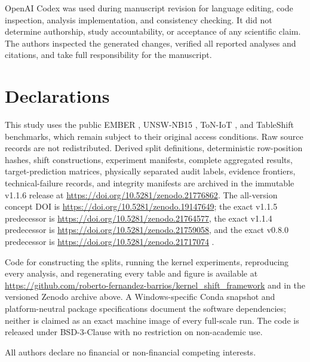 \documentclass[referee,lineno,pdflatex,sn-nature]{sn-jnl}
\theoremstyle{thmstyleone}%
\theoremstyle{thmstyletwo}%
\theoremstyle{thmstylethree}%
\begin{document}
OpenAI Codex was used during manuscript revision for language editing, code inspection, analysis implementation, and consistency checking. It did not determine authorship, study accountability, or acceptance of any scientific claim. The authors inspected the generated changes, verified all reported analyses and citations, and take full responsibility for the manuscript.

\backmatter

\section*{Declarations}

This study uses the public EMBER \cite{anderson2018ember}, UNSW-NB15 \cite{moustafa2015unsw}, ToN-IoT \cite{alsaedi2020toniot}, and TableShift \cite{gardner2023tableshift} benchmarks, which remain subject to their original access conditions. Raw source records are not redistributed. Derived split definitions, deterministic row-position hashes, shift constructions, experiment manifests, complete aggregated results, target-prediction matrices, physically separated audit labels, evidence frontiers, technical-failure records, and integrity manifests are archived in the immutable v1.1.6 release at \url{https://doi.org/10.5281/zenodo.21776862}. The all-version concept DOI is \url{https://doi.org/10.5281/zenodo.19147649}; the exact v1.1.5 predecessor is \url{https://doi.org/10.5281/zenodo.21764577}, the exact v1.1.4 predecessor is \url{https://doi.org/10.5281/zenodo.21759058}, and the exact v0.8.0 predecessor is \url{https://doi.org/10.5281/zenodo.21717074} \cite{fernandezbarrios2026artifactv08}.

Code for constructing the splits, running the kernel experiments, reproducing every analysis, and regenerating every table and figure is available at \url{https://github.com/roberto-fernandez-barrios/kernel_shift_framework} and in the versioned Zenodo archive above. A Windows-specific Conda snapshot and platform-neutral package specifications document the software dependencies; neither is claimed as an exact machine image of every full-scale run. The code is released under BSD-3-Clause with no restriction on non-academic use.

All authors declare no financial or non-financial competing interests.
\end{document}

